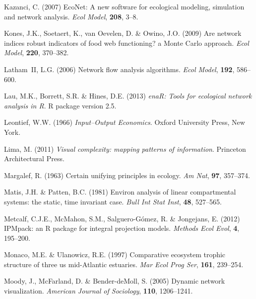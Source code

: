 \documentclass[11pt]{article}
\begin{document}
\begin{thebibliography}{79}
Kazanci, C. (2007) Eco{N}et: A new software for ecological modeling, simulation
  and network analysis.
\newblock \emph{Ecol Model}, \textbf{208}, 3--8.

Kones, J.K., Soetaert, K., van Oevelen, D. \& Owino, J.O. (2009) Are network
  indices robust indicators of food web functioning? a {M}onte {C}arlo
  approach.
\newblock \emph{Ecol Model}, \textbf{220}, 370--382.

Latham~II, L.G. (2006) Network flow analysis algorithms.
\newblock \emph{Ecol Model}, \textbf{192}, 586--600.

Lau, M.K., Borrett, S.R. \& Hines, D.E. (2013) \emph{enaR: Tools for ecological
  network analysis in R}.
\newblock R package version 2.5.

Leontief, W.W. (1966) \emph{Input--Output Economics}.
\newblock Oxford University Press, New York.

Lima, M. (2011) \emph{Visual complexity: mapping patterns of information}.
\newblock Princeton Architectural Press.

Margalef, R. (1963) Certain unifying principles in ecology.
\newblock \emph{Am Nat}, \textbf{97}, 357--374.

Matis, J.H. \& Patten, B.C. (1981) Environ analysis of linear compartmental
  systems: the static, time invariant case.
\newblock \emph{Bull Int Stat Inst}, \textbf{48}, 527--565.

Metcalf, C.J.E., McMahon, S.M., Salguero-G{\'o}mez, R. \& Jongejans, E. (2012)
  {IPM}pack: an {R} package for integral projection models.
\newblock \emph{Methods Ecol Evol}, \textbf{4}, 195--200.

Monaco, M.E. \& Ulanowicz, R.E. (1997) Comparative ecosystem trophic structure
  of three us mid-{A}tlantic estuaries.
\newblock \emph{Mar Ecol Prog Ser}, \textbf{161}, 239--254.

Moody, J., McFarland, D. \& Bender-deMoll, S. (2005) Dynamic network
  visualization.
\newblock \emph{American Journal of Sociology}, \textbf{110}, 1206--1241.


\end{thebibliography}
\end{document}
